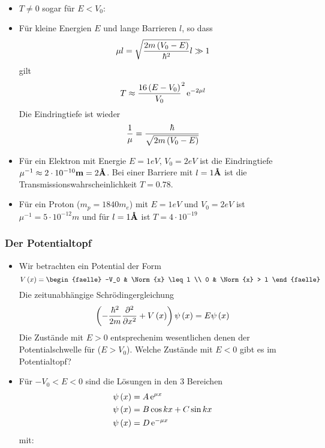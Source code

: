 \begin{itemize}
\begin{align}
  \end{align}
  \begin{itemize}
    \item $T \neq 0$ sogar für $E < V_0$: 
    \item Für kleine Energien $E$ und lange Barrieren $l$, so dass
    \begin{equation}
      \mu l = \sqrt{\frac{2m\left(V_0-E\right)}{\hbar^2}} l \gg 1
    \end{equation}
    gilt
    \begin{equation}
      T \approx \frac{16\left(E-V_0\right)}{V_0}^2 \, \text{e}^{- 2 \mu l}
    \end{equation}
    Die Eindringtiefe ist wieder
    \begin{equation}
      \frac{1}{\mu} = \frac{\hbar}{\sqrt{2m\left(V_0 - E\right)}}
    \end{equation}
    \item {} Für ein Elektron mit Energie $E = 1 \unit{eV}$, $V_0 = 2 \unit{eV}$ ist die Eindringtiefe $\mu^{-1} \approx 2 \cdot 10^{-10} \textbf{m} = 2 \textbf{\AA}$. Bei einer Barriere mit $l = 1 \textbf{\AA}$ ist die Transmissionswahrscheinlichkeit $T = 0.78$.
    \item {} Für ein Proton ($m_p = 1840 m_e$) mit $E = 1 \unit{eV}$ und $V_0 = 2 \unit{eV}$ ist $\mu^{-1} = 5 \cdot 10^{-12} \unit{m}$ und für $l = 1 \textbf{\AA}$ ist $T = 4\cdot 10^{-19}$
  \end{itemize}
\end{itemize}

\subsubsection{Der Potentialtopf}
\begin{itemize}
  \item Wir betrachten ein Potential der Form
  \begin{equation}
    V\of{x} = \begin{faelle} -V_0 & \Norm{x} \leq l \\ 0 & \Norm{x} > l \end{faelle}
  \end{equation}
  Die zeitunabhängige Schrödingergleichung
  \begin{equation}
    \left(-\frac{\hbar^2}{2m} \frac{\partial^{2} }{\partial x^{2}} + V\left(x\right)\right)\psi\left(x\right) = E \psi\left(x\right)
  \end{equation}
  Die Zustände mit $E > 0$ entsprechenim wesentlichen denen der Potentialschwelle für ($E > V_0$). Welche Zustände mit $E < 0$ gibt es im Potentialtopf?
  \item Für $-V_0 < E < 0$ sind die Lösungen in den $3$ Bereichen
  \begin{align}
    \psi\left(x\right) & = A \, \text{e}^{\mu x} \\
    \psi\left(x\right) & = B \cos kx + C\sin kx \\
    \psi\left(x\right) & = D \, \text{e}^{-\mu x} 
  \end{align}
  mit:
\end{itemize}
